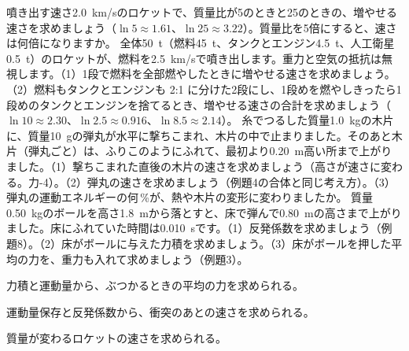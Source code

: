 \bkproblem 噴き出す速さ\qty{2.0}{km/s}のロケットで、質量比が5のときと25のときの、増やせる速さを求めましょう（$\ln5\approx1.61$、$\ln25\approx3.22$）。質量比を5倍にすると、速さは何倍になりますか。
\bkproblem 全体\qty{50}{t}（燃料\qty{45}{t}、タンクとエンジン\qty{4.5}{t}、人工衛星\qty{0.5}{t}）のロケットが、燃料を\qty{2.5}{km/s}で噴き出します。重力と空気の抵抗は無視します。（1）1段で燃料を全部燃やしたときに増やせる速さを求めましょう。（2）燃料もタンクとエンジンも 2:1 に分けた2段にし、1段めを燃やしきったら1段めのタンクとエンジンを捨てるとき、増やせる速さの合計を求めましょう（$\ln10\approx2.30$、$\ln2.5\approx0.916$、$\ln8.5\approx2.14$）。
\bkproblem 糸でつるした質量\qty{1.0}{kg}の木片に、質量\qty{10}{g}の弾丸が水平に撃ちこまれ、木片の中で止まりました。そのあと木片（弾丸ごと）は、ふりこのようにふれて、最初より\qty{0.20}{m}高い所まで上がりました。（1）撃ちこまれた直後の木片の速さを求めましょう（高さが速さに変わる。力-4）。（2）弾丸の速さを求めましょう（例題4の合体と同じ考え方）。（3）弾丸の運動エネルギーの何\,\%が、熱や木片の変形に変わりましたか。
\bkproblem 質量\qty{0.50}{kg}のボールを高さ\qty{1.8}{m}から落とすと、床で弾んで\qty{0.80}{m}の高さまで上がりました。床にふれていた時間は\qty{0.010}{s}です。（1）反発係数を求めましょう（例題8）。（2）床がボールに与えた力積を求めましょう。（3）床がボールを押した平均の力を、重力も入れて求めましょう（例題3）。

\newpage
\begin{furikaeri}
\begin{checklist}
\item 力積と運動量から、ぶつかるときの平均の力を求められる。
\item 運動量保存と反発係数から、衝突のあとの速さを求められる。
\item 質量が変わるロケットの速さを求められる。
\end{checklist}
\end{furikaeri}
